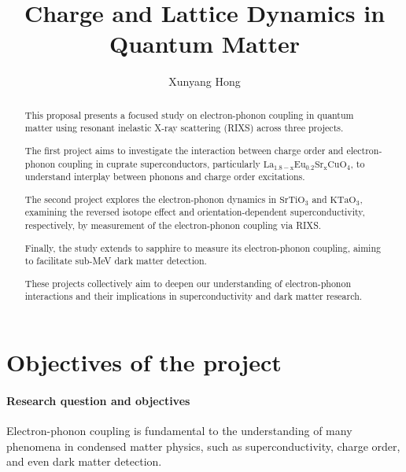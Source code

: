 \documentclass[11pt]{article}
\begin{document}
\title{Charge and Lattice Dynamics in Quantum Matter}
\author{Xunyang Hong}
\date{}
\maketitle





\begin{abstract}
This proposal presents a focused study on electron-phonon coupling in quantum matter using resonant inelastic X-ray scattering (RIXS) across three projects.

The first project aims to investigate the interaction between charge order and electron-phonon coupling in cuprate superconductors, particularly $\mathrm{La_{1.8-x}Eu_{0.2}Sr_xCuO_{4}}$, to understand interplay between phonons and charge order excitations.

The second project explores the electron-phonon dynamics in $\mathrm{SrTiO_{3}}$ and $\mathrm{KTaO_{3}}$, examining the reversed isotope effect and orientation-dependent superconductivity, respectively, by measurement of the electron-phonon coupling via RIXS.

Finally, the study extends to sapphire to measure its electron-phonon coupling, aiming to facilitate sub-MeV dark matter detection.

These projects collectively aim to deepen our understanding of electron-phonon interactions and their implications in superconductivity and dark matter research.
\end{abstract}

\section{Objectives of the project}

\paragraph{Research question and objectives}
Electron-phonon coupling is fundamental to the understanding of many phenomena in condensed matter physics, such as superconductivity\cite{bardeen_theory_1957,cuk_review_2005}, charge order\cite{arpaia_charge_2021,comin_resonant_2016,tranquada_spins_2013}, and even dark matter detection\cite{griffin_directional_2018}. 
\end{document}

